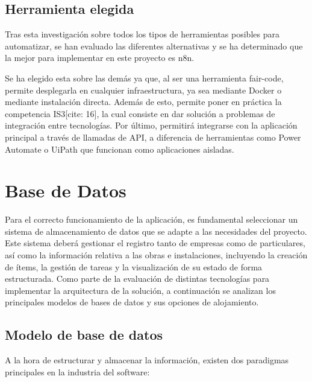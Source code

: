 \documentclass[12pt, a4paper]{book}
\begin{document}
\subsection{Herramienta elegida}

Tras esta investigación sobre todos los tipos de herramientas posibles para automatizar, se han evaluado las diferentes alternativas y se ha determinado que la mejor para implementar en este proyecto es n8n. 

Se ha elegido esta sobre las demás ya que, al ser una herramienta fair-code, permite desplegarla en cualquier infraestructura, ya sea mediante Docker o mediante instalación directa. Además de esto, permite poner en práctica la competencia IS3[cite: 16], la cual consiste en dar solución a problemas de integración entre tecnologías. Por último, permitirá integrarse con la aplicación principal a través de llamadas de API, a diferencia de herramientas como Power Automate o UiPath que funcionan como aplicaciones aisladas.

\section{Base de Datos}

Para el correcto funcionamiento de la aplicación, es fundamental seleccionar un sistema de almacenamiento de datos que se adapte a las necesidades del proyecto. Este sistema deberá gestionar el registro tanto de empresas como de particulares, así como la información relativa a las obras e instalaciones, incluyendo la creación de ítems, la gestión de tareas y la visualización de su estado de forma estructurada. Como parte de la evaluación de distintas tecnologías para implementar la arquitectura de la solución, a continuación se analizan los principales modelos de bases de datos y sus opciones de alojamiento.

\subsection{Modelo de base de datos}

A la hora de estructurar y almacenar la información, existen dos paradigmas principales en la industria del software:
\end{document}
